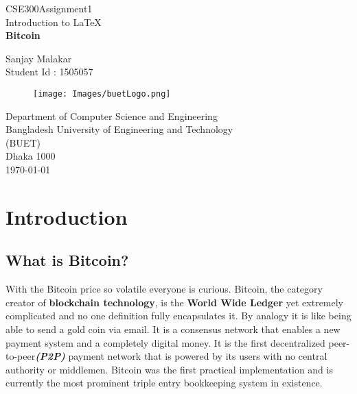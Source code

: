 \documentclass{article}
\begin{document}
        
        \begin{center}
            
            \Huge
            CSE300\textunderscore Assignment1\\
            Introduction to \LaTeX \\
            \textbf{Bitcoin\\}
            
            \vspace{0.5cm}
            
            \LARGE
            Sanjay Malakar\\
            Student Id : 1505057\\
            
            \vspace{7cm}
            
            \begin{figure}[h]
                \centering
                \texttt{[image: Images/buetLogo.png]}
            \end{figure}
            
             \Large
            Department of Computer Science and Engineering\\
            Bangladesh University of Engineering and Technology\\
            (BUET)\\
            Dhaka 1000\\
            \today
            
        \end{center}
        
\newpage

    \tableofcontents
    
\newpage

\section{Introduction}

\subsection{What is Bitcoin?}
With the Bitcoin price so volatile everyone is curious. Bitcoin, the category creator of \textbf{blockchain technology}, is the \textbf{World Wide Ledger} yet extremely complicated and no one definition fully encapsulates it. By analogy it is like being able to send a gold coin via email. It is a consensus network that enables a new payment system and a completely digital money.
\newline
It is the first decentralized peer-to-peer\textbf{\textit{(P2P)}} payment network that is powered by its users with no central authority or middlemen. Bitcoin was the first practical implementation and is currently the most prominent triple entry bookkeeping system in existence.
\end{document}
